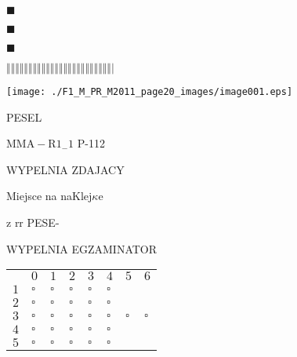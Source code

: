 \documentclass[a4paper,12pt]{article}
\begin{document}
$\blacksquare$

$\blacksquare$

$\blacksquare$

$\Vert\Vert\Vert\Vert\Vert\Vert\Vert\Vert\Vert\Vert\Vert\Vert\Vert\Vert\Vert\Vert\Vert\Vert\Vert\Vert\Vert\Vert\Vert\Vert|$
\begin{center}
\texttt{[image: ./F1\_M\_PR\_M2011\_page20\_images/image001.eps]}
\end{center}
PESEL

$\mathrm{M}\mathrm{M}\mathrm{A}-\mathrm{R}1_{-}1$ P-112

WYPELNIA ZDAJACY

Miejsce na naKlej$\kappa$e

z rr PESE-

WYPELNIA EGZAMINATOR
\begin{center}
\begin{tabular}{|l|l|l|l|l|l|l|l|}
	\\
&	\multicolumn{1}{|l|}{$0$}&	\multicolumn{1}{|l|}{ $1$}&	\multicolumn{1}{|l|}{ $2$}&	\multicolumn{1}{|l|}{ $3$}&	\multicolumn{1}{|l|}{ $4$}&	\multicolumn{1}{|l|}{ $5$}&	\multicolumn{1}{|l|}{ $6$}	\\
\cline{2-8}
\multicolumn{1}{|l|}{ $1$}&	\multicolumn{1}{|l|}{ $\square $}&	\multicolumn{1}{|l|}{ $\square $}&	\multicolumn{1}{|l|}{ $\square $}&	\multicolumn{1}{|l|}{ $\square $}&	\multicolumn{1}{|l|}{ $\square $}&	\multicolumn{1}{|l|}{}&	\multicolumn{1}{|l|}{}	\\
\hline
\multicolumn{1}{|l|}{ $2$}&	\multicolumn{1}{|l|}{ $\square $}&	\multicolumn{1}{|l|}{ $\square $}&	\multicolumn{1}{|l|}{ $\square $}&	\multicolumn{1}{|l|}{ $\square $}&	\multicolumn{1}{|l|}{ $\square $}&	\multicolumn{1}{|l|}{}&	\multicolumn{1}{|l|}{}	\\
\hline
\multicolumn{1}{|l|}{ $3$}&	\multicolumn{1}{|l|}{ $\square $}&	\multicolumn{1}{|l|}{ $\square $}&	\multicolumn{1}{|l|}{ $\square $}&	\multicolumn{1}{|l|}{ $\square $}&	\multicolumn{1}{|l|}{ $\square $}&	\multicolumn{1}{|l|}{ $\square $}&	\multicolumn{1}{|l|}{ $\square $}	\\
\hline
\multicolumn{1}{|l|}{ $4$}&	\multicolumn{1}{|l|}{ $\square $}&	\multicolumn{1}{|l|}{ $\square $}&	\multicolumn{1}{|l|}{ $\square $}&	\multicolumn{1}{|l|}{ $\square $}&	\multicolumn{1}{|l|}{ $\square $}&	\multicolumn{1}{|l|}{}&	\multicolumn{1}{|l|}{}	\\
\hline
\multicolumn{1}{|l|}{ $5$}&	\multicolumn{1}{|l|}{ $\square $}&	\multicolumn{1}{|l|}{ $\square $}&	\multicolumn{1}{|l|}{ $\square $}&	\multicolumn{1}{|l|}{ $\square $}&	\multicolumn{1}{|l|}{ $\square $}&	\multicolumn{1}{|l|}{}&	\multicolumn{1}{|l|}{}	\\

\end{tabular}
\end{center}
\end{document}

